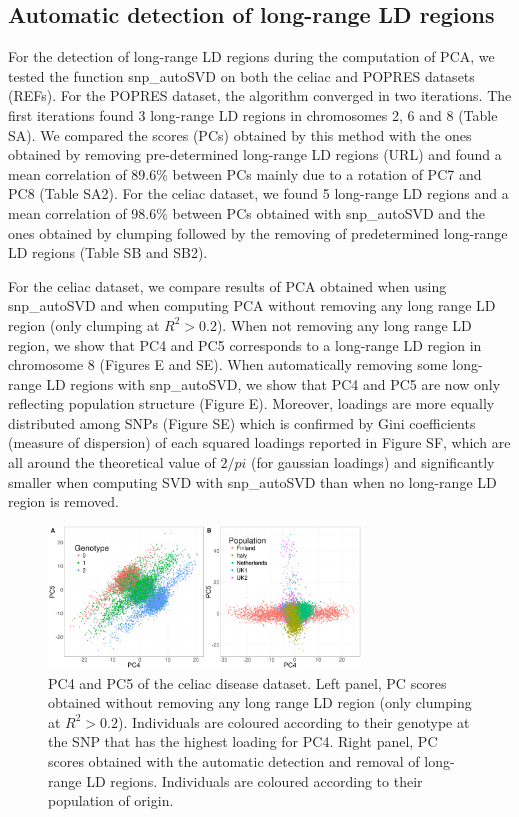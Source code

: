 \documentclass{bioinfo}
\begin{document}
\subsection{Automatic detection of long-range LD regions}

For the detection of long-range LD regions during the computation of PCA, we tested the function snp\_autoSVD on both the celiac and POPRES datasets (REFs). For the POPRES dataset, the algorithm converged in two iterations. The first iterations found 3 long-range LD regions in chromosomes 2, 6 and 8 (Table SA). We compared the scores (PCs) obtained by this method with the ones obtained by removing pre-determined long-range LD regions (URL) and found a mean correlation of 89.6\% between PCs mainly due to a rotation of PC7 and PC8 (Table SA2). For the celiac dataset, we found 5 long-range LD regions and a mean correlation of 98.6\% between PCs obtained with snp\_autoSVD and the ones obtained by clumping followed by the removing of predetermined long-range LD regions (Table SB and SB2).

For the celiac dataset, we compare results of PCA obtained when using snp\_autoSVD and when computing PCA without removing any long range LD region (only clumping at $R^2 > 0.2$). When not removing any long range LD region, we show that PC4 and PC5 corresponds to a long-range LD region in chromosome 8 (Figures E and SE). When automatically removing some long-range LD regions with snp\_autoSVD, we show that PC4 and PC5 are now only reflecting population structure (Figure E). Moreover, loadings are more equally distributed among SNPs (Figure SE) which is confirmed by Gini coefficients (measure of dispersion) of each squared loadings reported in Figure SF, which are all around the theoretical value of $2 / pi$ (for gaussian loadings) and significantly smaller when computing SVD with snp\_autoSVD than when no long-range LD region is removed.

\begin{figure}[!tpb]
\centerline{\includegraphics[width=235pt]{scores}}
\caption{PC4 and PC5 of the celiac disease dataset. Left panel, PC scores obtained without removing any long range LD region (only clumping at $R^2 > 0.2$). Individuals are coloured according to their genotype at the SNP that has the highest loading for PC4. Right panel, PC scores obtained with the automatic detection and removal of long-range LD regions. Individuals are coloured according to their population of origin.}\label{fig:scores}
\end{figure}
\end{document}
